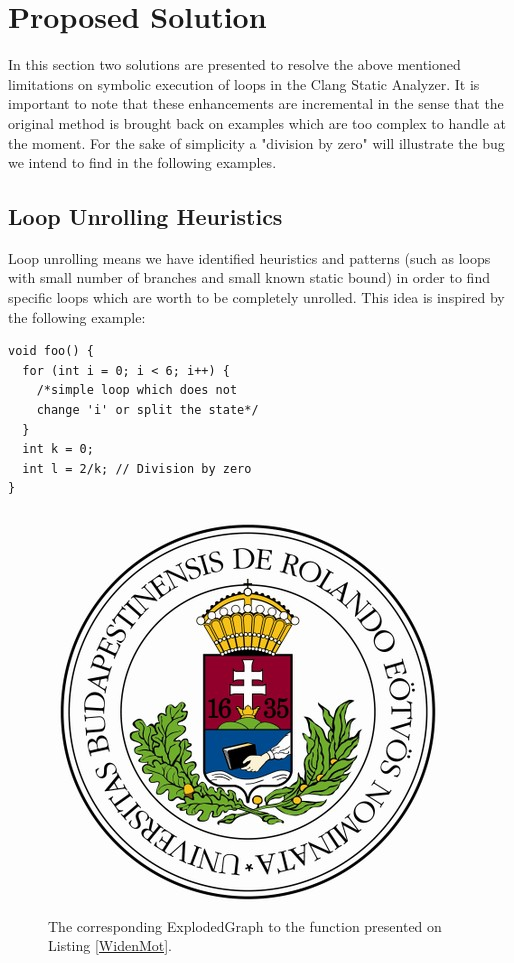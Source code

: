 
\section{Proposed Solution}
In this section two solutions are presented to resolve the above mentioned
limitations on symbolic execution of loops in the Clang Static Analyzer. It 
is important to note that these enhancements are incremental in the sense 
that the original method is brought back on examples which are too complex to handle at the moment. For the sake of simplicity a 
"division by zero" will illustrate the bug we intend to find in the following examples.

\subsection{Loop Unrolling Heuristics}
Loop unrolling means we have identified heuristics and patterns (such as 
loops
with small number of branches and small known static bound) in order to find
specific loops which are worth to be completely unrolled. This idea is 
inspired by the following example:

\begin{lstlisting}
void foo() {
  for (int i = 0; i < 6; i++) {
    /*simple loop which does not
    change 'i' or split the state*/
  }
  int k = 0;
  int l = 2/k; // Division by zero
}\end{lstlisting}

\begin{figure}[h]
	\centering
	\includegraphics[scale=0.3]{img/elte-cimer}
	\caption{The corresponding ExplodedGraph to the function presented on 
		Listing \ref{WidenMot}.}
	\label{fig:eg_mot_1}
\end{figure}

